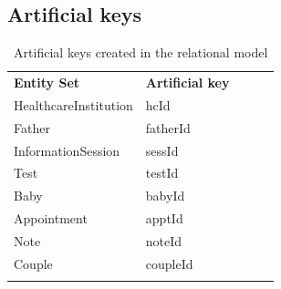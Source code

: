 \documentclass[10pt, letterpaper]{article}
\begin{document}
\subsection*{Artificial keys}
\begin{table}[h]
    \begin{center}
        \begin{tabular}{lllll}
            \cline{1-2}
            \multicolumn{1}{|l|}{\textbf{Entity Set}}   & \multicolumn{1}{l|}{\textbf{Artificial key}} &  &  & \\ \cline{1-2}
            \multicolumn{1}{|l|}{HealthcareInstitution} & \multicolumn{1}{l|}{hcId}                    &  &  & \\ \cline{1-2}
            \multicolumn{1}{|l|}{Father}                & \multicolumn{1}{l|}{fatherId}                &  &  & \\ \cline{1-2}
            \multicolumn{1}{|l|}{InformationSession}    & \multicolumn{1}{l|}{sessId}                  &  &  & \\ \cline{1-2}
            \multicolumn{1}{|l|}{Test}                  & \multicolumn{1}{l|}{testId}                  &  &  & \\ \cline{1-2}
            \multicolumn{1}{|l|}{Baby}                  & \multicolumn{1}{l|}{babyId}                  &  &  & \\ \cline{1-2}
            \multicolumn{1}{|l|}{Appointment}           & \multicolumn{1}{l|}{apptId}                  &  &  & \\ \cline{1-2}
            \multicolumn{1}{|l|}{Note}                  & \multicolumn{1}{l|}{noteId}                  &  &  & \\ \cline{1-2}
            \multicolumn{1}{|l|}{Couple}                & \multicolumn{1}{l|}{coupleId}                &  &  & \\ \cline{1-2}
                                                        &                                              &  &  &
        \end{tabular}
    \end{center}
    \caption{Artificial keys created in the relational model}
\end{table}
\end{document}
